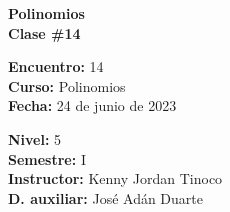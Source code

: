 \begin{center} \textbf
{
    \Large Polinomios \\ \vspace{2mm}Clase \#14
}
\end{center}

\begin{multicols}{2}
{
    \textbf{Encuentro:} 14\\
    \textbf{Curso:} Polinomios\\
    \textbf{Fecha:} 24 de junio de 2023\\
    \begin{flushright}
        \textbf{Nivel:} 5\\
        \textbf{Semestre:} I\\
        \textbf{Instructor:} Kenny Jordan Tinoco\\
        \textbf{D. auxiliar: }José Adán Duarte
    \end{flushright}
}
\end{multicols}

\thispagestyle{first-page-style}